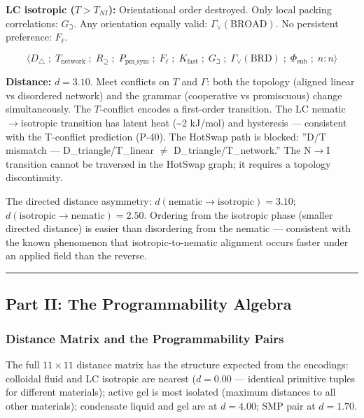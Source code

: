 \documentclass[12pt,a4paper]{article}
\begin{document}
\textbf{LC isotropic ($T > T_{NI}$):} Orientational order destroyed. Only local packing correlations: $G_\beth$. Any orientation equally valid: $\Gamma_\vee(\text{BROAD})$. No persistent preference: $F_\ell$.

\[\langle D_\triangle \;;\; T_\text{network} \;;\; R_{\supseteq} \;;\; P_{\text{pm\_sym}} \;;\; F_\ell \;;\; K_\text{fast} \;;\; G_\beth \;;\; \Gamma_\vee(\text{BRD}) \;;\; \Phi_\text{sub} \;;\; n:n \rangle\]

\textbf{Distance:} $d = 3.10$. Meet conflicts on $T$ and $\Gamma$: both the topology (aligned linear vs disordered network) and the grammar (cooperative vs promiscuous) change simultaneously. The $T$-conflict encodes a first-order transition. The LC nematic$\rightarrow$isotropic transition has latent heat (\textasciitilde{}2 kJ/mol) and hysteresis --- consistent with the T-conflict prediction (P-40). The HotSwap path is blocked: ''D/T mismatch --- D\_triangle/T\_linear $\neq$ D\_triangle/T\_network.'' The N$\rightarrow$I transition cannot be traversed in the HotSwap graph; it requires a topology discontinuity.

The directed distance asymmetry: $d(\text{nematic} \to \text{isotropic}) = 3.10$; $d(\text{isotropic} \to \text{nematic}) = 2.50$. Ordering from the isotropic phase (smaller directed distance) is easier than disordering from the nematic --- consistent with the known phenomenon that isotropic-to-nematic alignment occurs faster under an applied field than the reverse.

\begin{center}
\rule{0.5\textwidth}{0.4pt}
\end{center}

\subsection{Part II: The Programmability Algebra}

\subsubsection{Distance Matrix and the Programmability Pairs}

The full $11 \times 11$ distance matrix has the structure expected from the encodings: colloidal fluid and LC isotropic are nearest ($d = 0.00$ --- identical primitive tuples for different materials); active gel is most isolated (maximum distances to all other materials); condensate liquid and gel are at $d = 4.00$; SMP pair at $d = 1.70$.
\end{document}
